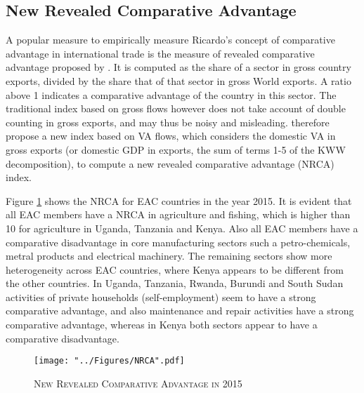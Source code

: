 \documentclass[a4paper]{article}
\begin{document}
\subsection{New Revealed Comparative Advantage}
A popular measure to empirically measure Ricardo's concept of comparative advantage in international trade is the measure of revealed comparative advantage proposed by \citet{balassa1965trade}. It is computed as the share of a sector in gross country exports, divided by the share that of that sector in gross World exports. A ratio above 1 indicates a comparative advantage of the country in this sector. The traditional index based on gross flows however does not take account of double counting in gross exports, and may thus be noisy and misleading. \citet{koopman2014tracing} therefore propose a new index based on VA flows, which considers the domestic VA in gross exports (or domestic GDP in exports, the sum of terms 1-5 of the KWW decomposition), to compute a new revealed comparative advantage (NRCA) index. \newline

Figure \ref{fig:NRCA} shows the NRCA for EAC countries in the year 2015. It is evident that all EAC members have a NRCA in agriculture and fishing, which is higher than 10 for agriculture in Uganda, Tanzania and Kenya. Also all EAC members have a comparative disadvantage in core manufacturing sectors such a petro-chemicals, metral products and electrical machinery. The remaining sectors show more heterogeneity across EAC countries, where Kenya appears to be different from the other countries. In Uganda, Tanzania, Rwanda, Burundi and South Sudan activities of private households (self-employment) seem to have a strong comparative advantage, and also maintenance and repair activities have a strong comparative advantage, whereas in Kenya both sectors appear to have a comparative disadvantage. \newline

\begin{figure}[h!]
\centering
\caption{\label{fig:NRCA}\textsc{New Revealed Comparative Advantage in 2015}}
\texttt{[image: "../Figures/NRCA".pdf]} %
\end{figure}
\FloatBarrier
\end{document}
